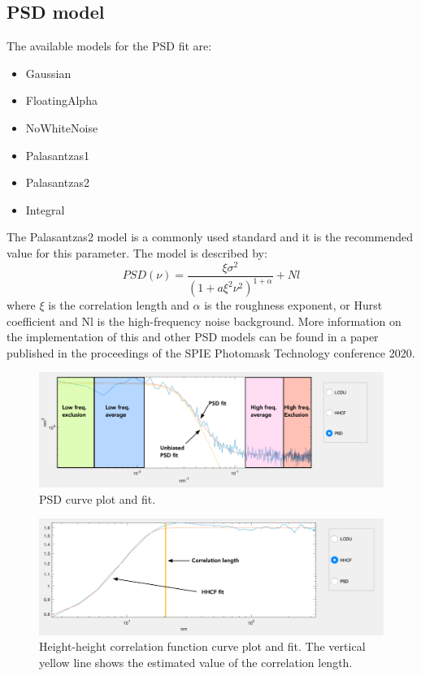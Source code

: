 \documentclass[12pt, a4paper, openany]{report}
\begin{document}
\subsection{PSD model}
The available models for the PSD fit are:
\begin{itemize}
\item Gaussian
\item FloatingAlpha
\item NoWhiteNoise
\item Palasantzas1
\item Palasantzas2
\item Integral
\end{itemize}
The Palasantzas2 \cite{PhysRevB.48.14472} model is a commonly used standard and it is the recommended value for this parameter. The model is described by:
\begin{equation}
    PSD(\nu)=\frac{\xi\sigma^2}{\left(1+a\xi^2 \nu^2\right)^{1+\alpha}}+Nl
    \label{eq:palasantzas}
\end{equation}
where $\xi$ is the correlation length and $\alpha$ is the roughness exponent, or Hurst coefficient and Nl is the high-frequency noise background. More information on the implementation of this and other PSD models can be found in a paper published in the proceedings of the SPIE Photomask Technology conference 2020.\cite{Mochi_SMILE}
\begin{figure}[hbt]
\includegraphics[width=\textwidth]{figures/PSD_01.png}
\caption{PSD curve plot and fit.}
\label{fig:PSD01}
\end{figure}
\begin{figure}[hbt]
\includegraphics[width=\textwidth]{figures/HHCF_01.png}
\caption{Height-height correlation function curve plot and fit. The vertical yellow line shows the estimated value of the correlation length.}
\label{fig:HHCF01}
\end{figure}
\end{document}
